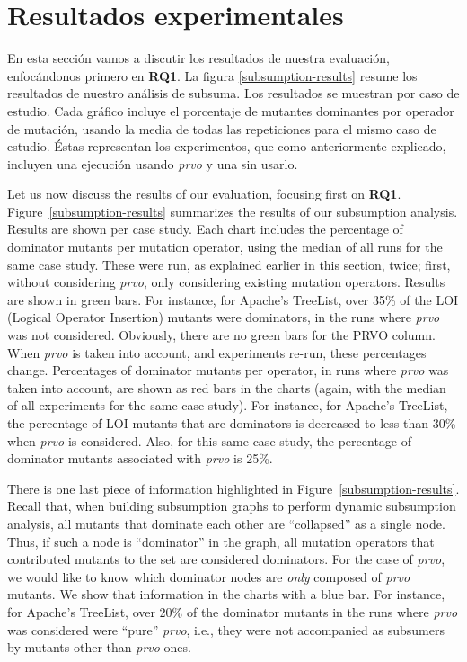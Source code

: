 
\section{Resultados experimentales}

En esta secci\'on vamos a discutir los resultados de nuestra evaluaci\'on, enfoc\'andonos primero en \textbf{RQ1}. La figura \ref{subsumption-results} resume los resultados de nuestro an\'alisis de subsuma. Los resultados se muestran por caso de estudio. Cada gr\'afico incluye el porcentaje de mutantes dominantes por operador de mutaci\'on, usando la media de todas las repeticiones para el mismo caso de estudio. \'Estas representan los experimentos, que como anteriormente explicado, incluyen una ejecuci\'on usando \emph{prvo} y una sin usarlo.

Let us now discuss the results of our evaluation, focusing first on \textbf{RQ1}. Figure~\ref{subsumption-results} summarizes the results of our subsumption analysis. Results are shown per case study. Each chart includes the percentage of dominator mutants per mutation operator, using the median of all runs for the same case study. These were run, as explained earlier in this section, twice; first, without considering \emph{prvo}, only considering existing mutation operators. Results are shown in green bars. For instance, for Apache's TreeList, over 35\% of the LOI (Logical Operator Insertion) mutants were dominators, in the runs where \emph{prvo} was not considered. Obviously, there are no green bars for the PRVO column. When \emph{prvo} is taken into account, and experiments re-run, these percentages change. Percentages of dominator mutants per operator, in runs where \emph{prvo} was taken into account, are shown as red bars in the charts (again, with the median of all experiments for the same case study). For instance, for Apache's TreeList, the percentage of LOI mutants that are dominators is decreased to less than 30\% when \emph{prvo} is considered. Also, for this same case study, the percentage of dominator mutants associated with \emph{prvo} is 25\%. 

There is one last piece of information highlighted in Figure~\ref{subsumption-results}. Recall that, when building subsumption graphs to perform dynamic subsumption analysis, all mutants that dominate each other are ``collapsed'' as a single node. Thus, if such a node is ``dominator'' in the graph, all mutation operators that contributed mutants to the set are considered dominators. For the case of \emph{prvo}, we would like to know which dominator nodes are \emph{only} composed of \emph{prvo} mutants. We show that information in the charts with a blue bar. For instance, for Apache's TreeList, over 20\% of the dominator mutants in the runs where \emph{prvo} was considered were ``pure'' \emph{prvo}, i.e., they were not accompanied as subsumers by mutants other than \emph{prvo} ones. 

